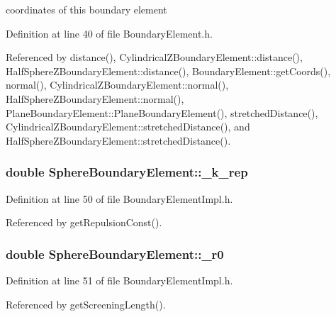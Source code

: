 coordinates of this boundary element 



Definition at line 40 of file Boundary\+Element.\+h.



Referenced by distance(), Cylindrical\+Z\+Boundary\+Element\+::distance(), Half\+Sphere\+Z\+Boundary\+Element\+::distance(), Boundary\+Element\+::get\+Coords(), normal(), Cylindrical\+Z\+Boundary\+Element\+::normal(), Half\+Sphere\+Z\+Boundary\+Element\+::normal(), Plane\+Boundary\+Element\+::\+Plane\+Boundary\+Element(), stretched\+Distance(), Cylindrical\+Z\+Boundary\+Element\+::stretched\+Distance(), and Half\+Sphere\+Z\+Boundary\+Element\+::stretched\+Distance().

\hypertarget{classSphereBoundaryElement_a4bca6baf26a3fb1718aaaed348646a58}{
\subsubsection[{\+\_\+k\+\_\+rep}]{\setlength{\rightskip}{0pt plus 5cm}double Sphere\+Boundary\+Element\+::\+\_\+k\+\_\+rep\hspace{0.3cm}{\ttfamily [private]}}}\label{classSphereBoundaryElement_a4bca6baf26a3fb1718aaaed348646a58}


Definition at line 50 of file Boundary\+Element\+Impl.\+h.



Referenced by get\+Repulsion\+Const().

\hypertarget{classSphereBoundaryElement_a3e80ad9724c8ae7ff03631b4f2f84d1b}{
\subsubsection[{\+\_\+r0}]{\setlength{\rightskip}{0pt plus 5cm}double Sphere\+Boundary\+Element\+::\+\_\+r0\hspace{0.3cm}{\ttfamily [private]}}}\label{classSphereBoundaryElement_a3e80ad9724c8ae7ff03631b4f2f84d1b}


Definition at line 51 of file Boundary\+Element\+Impl.\+h.



Referenced by get\+Screening\+Length().

